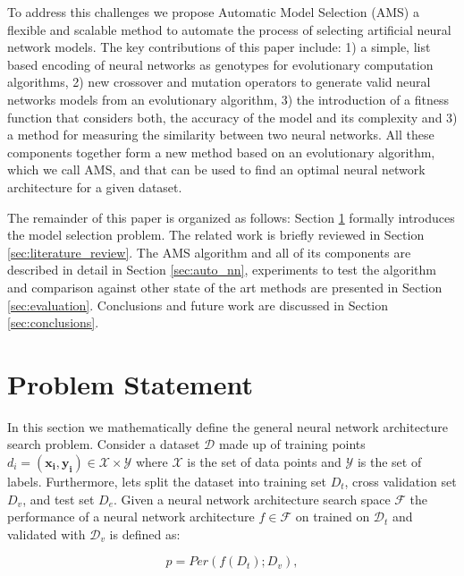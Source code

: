 \documentclass[journal]{IEEEtran}
\begin{document}
To address this challenges we propose Automatic Model Selection (AMS) a flexible and scalable method to automate the process of selecting artificial neural network models. The key contributions of this paper include: 1) a simple, list based encoding of neural networks as genotypes for evolutionary computation algorithms, 2) new crossover and mutation operators to generate valid neural networks models from an evolutionary algorithm, 3) the introduction of a fitness function that considers both, the accuracy of the model and its complexity and 3) a method for measuring the similarity between two neural networks. All these components together form a new method based on an evolutionary algorithm, which we call AMS, and that can be used to find an optimal neural network architecture for a given dataset.

The remainder of this paper is organized as follows: Section \ref{sec:model_selection} formally introduces the model selection problem. The related work is briefly reviewed in Section \ref{sec:literature_review}. The AMS algorithm and all of its components are described in detail in Section \ref{sec:auto_nn}, experiments to test the algorithm and comparison against other state of the art methods are presented in Section \ref{sec:evaluation}. Conclusions and future work are discussed in Section \ref{sec:conclusions}.


\section{Problem Statement}
\label{sec:model_selection}

In this section we mathematically define the general neural network architecture search problem. Consider a dataset $\mathcal{D}$ made up of training points $d_i = (\mathbf{x_i}, \mathbf{y_i}) \in \mathcal{X} \times \mathcal{Y}$ where $\mathcal{X}$ is the set of data points and $\mathcal{Y}$ is the set of labels. Furthermore, lets split the dataset into training set $D_t$, cross validation set $D_v$, and test set $D_e$. Given a neural network architecture search space $\mathcal{F}$ the performance of a neural network architecture $f \in \mathcal{F}$ on trained on $\mathcal{D}_t$ and validated with  $\mathcal{D}_v$ is defined as:

\begin{equation}
p = Per(f(D_t); D_v),
\label{eq:nn_cost}
\end{equation}
\end{document}
